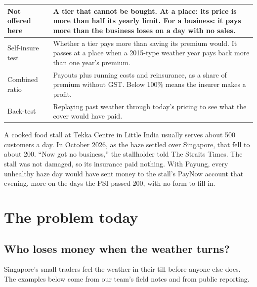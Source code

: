 \documentclass[11pt,a4paper]{article}
\begin{document}
{\begin{xltabular}{\textwidth}{|K{3.6cm}|Y|}
\hline
Not offered here & A tier that cannot be bought. At a place: its price is more than half its yearly limit. For a business: it pays more than the business loses on a day with no sales. \\
\hline
Self-insure test & Whether a tier pays more than saving its premium would. It passes at a place when a 2015-type weather year pays back more than one year's premium. \\
\hline
Combined ratio & Payouts plus running costs and reinsurance, as a share of premium without GST. Below 100\% means the insurer makes a profit. \\
\hline
Back-test & Replaying past weather through today's pricing to see what the cover would have paid. \\
\hline
\end{xltabular}}

\begin{tcolorbox}[colback=white,colframe=accent,boxrule=0.6pt,arc=2pt,left=8pt,right=8pt,top=5pt,bottom=5pt,title={\bfseries A hazy week at Tekka Centre},coltitle=white,colbacktitle=accent]
A cooked food stall at Tekka Centre in Little India usually serves about 500 customers a day. In October 2026, as the haze settled over Singapore, that fell to about 200. ``Now got no business,'' the stallholder told The Straits Times.\cite{st-haze} The stall was not damaged, so its insurance paid nothing. With Payung, every unhealthy haze day would have sent money to the stall's PayNow account that evening, more on the days the PSI passed 200, with no form to fill in.
\end{tcolorbox}

\section{The problem today}\label{sec:problem}

\subsection{Who loses money when the weather turns?}

Singapore's small traders feel the weather in their till before anyone else does. The examples below come from our team's field notes and from public reporting.
\end{document}
